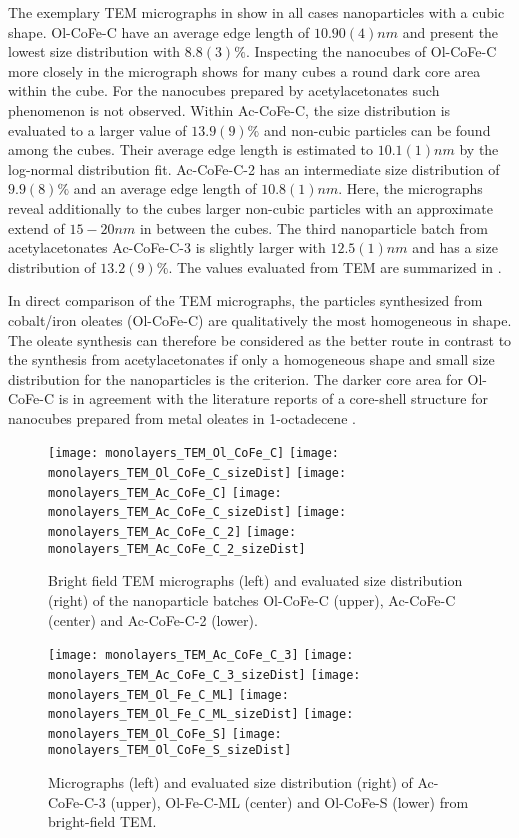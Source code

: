 \documentclass[\main/dresen_thesis.tex]{subfiles}
\begin{document}
  \label{sec:monolayers:nanoparticle:tem}
  The exemplary TEM micrographs in  show in all cases nanoparticles with a cubic shape.
  Ol-CoFe-C have an average edge length of $10.90(4) \unit{nm}$ and present the lowest size distribution with $8.8(3) \unit{\%}$.
  Inspecting the nanocubes of Ol-CoFe-C more closely in the micrograph shows for many cubes a round dark core area within the cube.
  For the nanocubes prepared by acetylacetonates such phenomenon is not observed.
  Within Ac-CoFe-C, the size distribution is evaluated to a larger value of $13.9(9) \unit{\%}$ and non-cubic particles can be found among the cubes.
  Their average edge length is estimated to $10.1(1) \unit{nm}$ by the log-normal distribution fit.
  Ac-CoFe-C-2 has an intermediate size distribution of $9.9(8) \%$ and an average edge length of $10.8(1) \unit{nm}$.
  Here, the micrographs reveal additionally to the cubes larger non-cubic particles with an approximate extend of $15 - 20 \unit{nm}$ in between the cubes.
  The third nanoparticle batch from acetylacetonates Ac-CoFe-C-3 is slightly larger with $12.5(1) \unit{nm}$ and has a size distribution of $13.2(9) \%$.
  The values evaluated from TEM are summarized in .

  In direct comparison of the TEM micrographs, the particles synthesized from cobalt/iron oleates (Ol-CoFe-C) are qualitatively the most homogeneous in shape.
  The oleate synthesis can therefore be considered as the better route in contrast to the synthesis from acetylacetonates  if only a homogeneous shape and small size distribution for the nanoparticles is the criterion.
  The darker core area for Ol-CoFe-C is in agreement with the literature reports of a core-shell structure for nanocubes prepared from metal oleates in 1-octadecene \cite{Bao_2009_Forma, Bodnarchuk_2009_Excha, Wetterskog_2013_Anoma}.

  \begin{figure}[tb]
    \centering
    \texttt{[image: monolayers\_TEM\_Ol\_CoFe\_C]}
    \texttt{[image: monolayers\_TEM\_Ol\_CoFe\_C\_sizeDist]}
    \texttt{[image: monolayers\_TEM\_Ac\_CoFe\_C]}
    \texttt{[image: monolayers\_TEM\_Ac\_CoFe\_C\_sizeDist]}
    \texttt{[image: monolayers\_TEM\_Ac\_CoFe\_C\_2]}
    \texttt{[image: monolayers\_TEM\_Ac\_CoFe\_C\_2\_sizeDist]}
    \caption{\label{fig:monolayers:nanoparticle:tem}Bright field TEM micrographs (left) and evaluated size distribution (right) of the nanoparticle batches Ol-CoFe-C (upper), Ac-CoFe-C (center) and Ac-CoFe-C-2 (lower).}
  \end{figure}
  \begin{figure}[tb]
    \centering
    \texttt{[image: monolayers\_TEM\_Ac\_CoFe\_C\_3]}
    \texttt{[image: monolayers\_TEM\_Ac\_CoFe\_C\_3\_sizeDist]}
    \texttt{[image: monolayers\_TEM\_Ol\_Fe\_C\_ML]}
    \texttt{[image: monolayers\_TEM\_Ol\_Fe\_C\_ML\_sizeDist]}
    \texttt{[image: monolayers\_TEM\_Ol\_CoFe\_S]}
    \texttt{[image: monolayers\_TEM\_Ol\_CoFe\_S\_sizeDist]}
    \caption{\label{fig:monolayers:nanoparticle:tem2}Micrographs (left) and evaluated size distribution (right) of Ac-CoFe-C-3 (upper), Ol-Fe-C-ML (center) and Ol-CoFe-S (lower) from bright-field TEM.}
  \end{figure}
\end{document}
